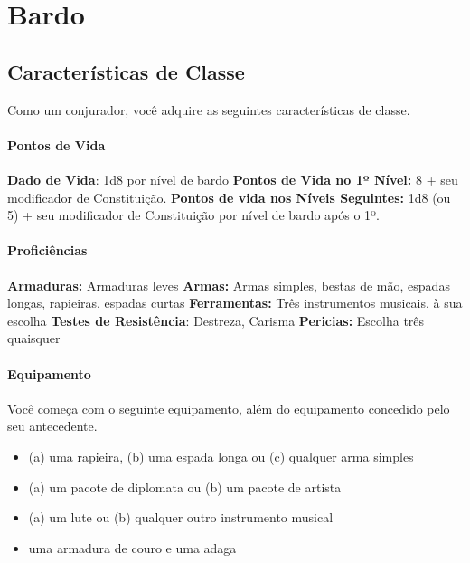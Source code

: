 \documentclass{RPG_Adventure}[2021/10/20]
\begin{document}

\chapter{Bardo}%
\label{cha:bardo}

\section*{Características de Classe}%

Como um conjurador, você adquire as seguintes características de classe.

\subsubsection{Pontos de Vida}%

\textbf{Dado de Vida}: 1d8 por nível de bardo \nl
\textbf{Pontos de Vida no 1º Nível:} 8 + seu modificador de Constituição. \nl
\textbf{Pontos de vida nos Níveis Seguintes:} 1d8 (ou 5) + seu modificador de
Constituição por nível de bardo após o 1º.

\subsubsection{Proficiências}%

\textbf{Armaduras:} Armaduras leves \nl
\textbf{Armas:} Armas simples, bestas de mão, espadas longas, rapieiras, espadas curtas \nl
\textbf{Ferramentas:} Três instrumentos musicais, à sua escolha \jump
\textbf{Testes de Resistência}: Destreza, Carisma \nl
\textbf{Pericias:} Escolha três quaisquer

\subsubsection{Equipamento}%

Você começa com o seguinte equipamento, além do equipamento concedido pelo seu
antecedente.
\begin{itemize}
    \item (a) uma rapieira, (b) uma espada longa ou (c) qualquer arma simples
    \item (a) um pacote de diplomata ou (b) um pacote de artista
    \item (a) um lute ou (b) qualquer outro instrumento musical
    \item uma armadura de couro e uma adaga
\end{itemize}
\end{document}
